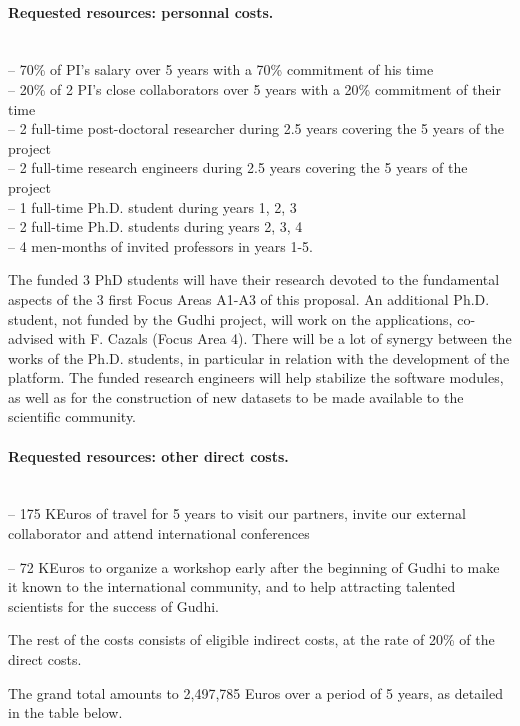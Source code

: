 \paragraph{Requested resources: personnal costs.}\mbox{}\\
-- 70\% of PI's salary over 5 years with a 70\% commitment of his time\\
-- 20\% of 2 PI's close collaborators over 5 years with a 20\% commitment of their time\\
-- 2 full-time post-doctoral researcher during 2.5 years covering the 5 years of the project\\
-- 2 full-time research engineers during 2.5 years covering the 5 years of the project\\
-- 1 full-time Ph.D. student during years 1, 2, 3\\
-- 2 full-time Ph.D. students during years 2, 3, 4\\
-- 4 men-months of invited professors in years 1-5.

The funded 3 PhD students will have their research devoted to the fundamental aspects of the 3 first Focus Areas A1-A3 of this proposal. An additional Ph.D. student, not funded by the Gudhi project, will work on the applications, co-advised with F. Cazals (Focus Area 4). There will be a lot of synergy between the works of the Ph.D. students, in particular in relation with the development of the platform. The funded research engineers will help stabilize the software modules, as well as for the construction of new datasets to be made available to the scientific community.

\paragraph{Requested resources: other direct costs.}\mbox{}\\
-- 175 KEuros of travel for 5 years to visit our partners, invite our external collaborator and attend international conferences

-- 72 KEuros to organize a workshop early after the beginning of Gudhi to make it known to the international community, and to help attracting talented scientists for the success of Gudhi.

The rest of the costs consists of eligible indirect costs, at the rate of 20\% of the direct costs.

The grand total amounts to 2,497,785 Euros over a period of 5 years, as detailed in the table below.



